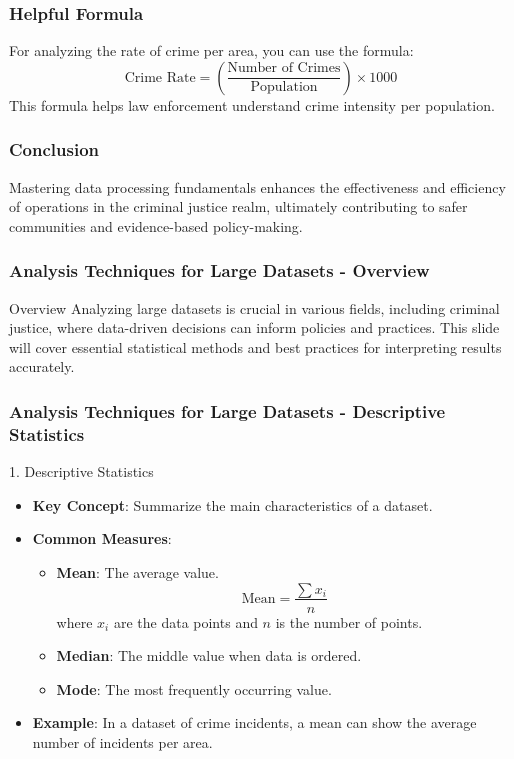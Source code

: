 \documentclass[aspectratio=169]{beamer}
\begin{document}
\begin{frame}[fragile]
    \frametitle{Helpful Formula}
    For analyzing the rate of crime per area, you can use the formula:
    \begin{equation}
    \text{Crime Rate} = \left( \frac{\text{Number of Crimes}}{\text{Population}} \right) \times 1000 
    \end{equation}
    This formula helps law enforcement understand crime intensity per population.
\end{frame}

\begin{frame}[fragile]
    \frametitle{Conclusion}
    Mastering data processing fundamentals enhances the effectiveness and efficiency of operations in the criminal justice realm, ultimately contributing to safer communities and evidence-based policy-making.
\end{frame}

\begin{frame}[fragile]
    \frametitle{Analysis Techniques for Large Datasets - Overview}
    \begin{block}{Overview}
        Analyzing large datasets is crucial in various fields, including criminal justice, where data-driven decisions can inform policies and practices. This slide will cover essential statistical methods and best practices for interpreting results accurately.
    \end{block}
\end{frame}

\begin{frame}[fragile]
    \frametitle{Analysis Techniques for Large Datasets - Descriptive Statistics}
    \begin{block}{1. Descriptive Statistics}
        \begin{itemize}
            \item \textbf{Key Concept}: Summarize the main characteristics of a dataset.
            \item \textbf{Common Measures}:
            \begin{itemize}
                \item \textbf{Mean}: The average value.
                \begin{equation}
                    \text{Mean} = \frac{\sum{x_i}}{n}
                \end{equation}
                where \( x_i \) are the data points and \( n \) is the number of points.
                \item \textbf{Median}: The middle value when data is ordered.
                \item \textbf{Mode}: The most frequently occurring value.
            \end{itemize}
            \item \textbf{Example}: In a dataset of crime incidents, a mean can show the average number of incidents per area.
        \end{itemize}
    \end{block}
\end{frame}
\end{document}
